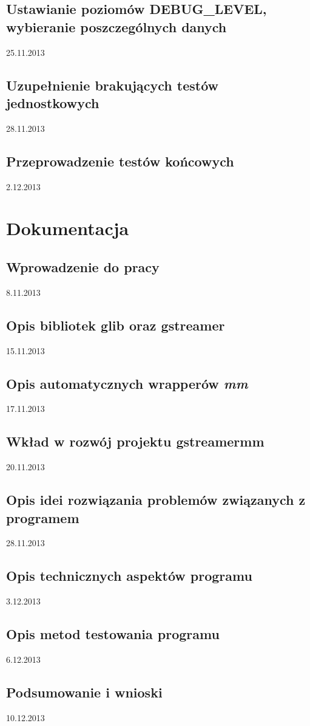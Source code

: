 \documentclass[titlepage]{article}
\begin{document}
\subsection{Ustawianie poziomów DEBUG\_LEVEL, wybieranie poszczególnych danych}
25.11.2013
\subsection{Uzupełnienie brakujących testów jednostkowych}
28.11.2013
\subsection{Przeprowadzenie testów końcowych}
2.12.2013
\cleardoublepage
\section{Dokumentacja}
\subsection{Wprowadzenie do pracy}
8.11.2013
\subsection{Opis bibliotek glib oraz gstreamer}
15.11.2013
\subsection{Opis automatycznych wrapperów \textit{mm}}
17.11.2013
\subsection{Wkład w rozwój projektu gstreamermm}
20.11.2013
\subsection{Opis idei rozwiązania problemów związanych z programem}
28.11.2013
\subsection{Opis technicznych aspektów programu}
3.12.2013
\subsection{Opis metod testowania programu}
6.12.2013
\subsection{Podsumowanie i wnioski}
10.12.2013
\end{document}
